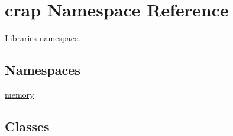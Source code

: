 \hypertarget{namespacecrap}{\section{crap Namespace Reference}
\label{namespacecrap}
}


Libraries namespace.  


\subsection*{Namespaces}
\begin{DoxyCompactItemize}
\item 
 \hyperlink{namespacecrap_1_1memory}{memory}
\end{DoxyCompactItemize}
\subsection*{Classes}
